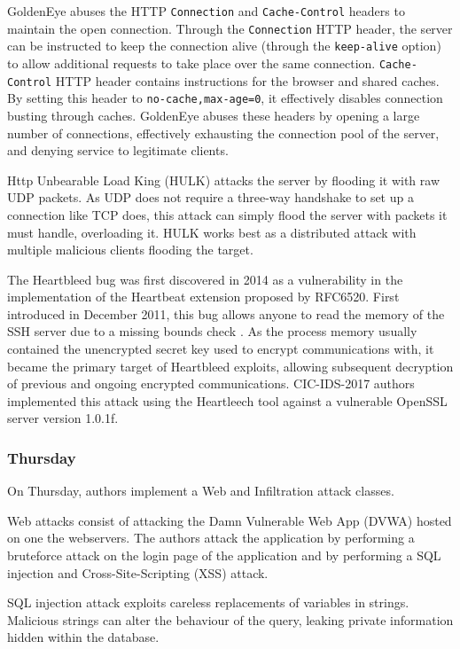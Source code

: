 GoldenEye abuses the HTTP \texttt{Connection} and \texttt{Cache-Control} headers to maintain the open connection. Through the \texttt{Connection} HTTP header, the server can be instructed to keep the connection alive (through the \texttt{keep-alive} option) to allow additional requests to take place over the same connection. \texttt{Cache-Control} HTTP header contains instructions for the browser and shared caches. By setting this header to \texttt{no-cache,max-age=0}, it effectively disables connection busting through caches.
GoldenEye abuses these headers by opening a large number of connections, effectively exhausting the connection pool of the server, and denying service to legitimate clients.

Http Unbearable Load King (HULK) attacks the server by flooding it with raw UDP packets. As UDP does not require a three-way handshake to set up a connection like TCP does, this attack can simply flood the server with packets it must handle, overloading it. HULK works best as a distributed attack with multiple malicious clients flooding the target.

The Heartbleed bug \cite{heartbleed} was first discovered in 2014 as a vulnerability in the implementation of the Heartbeat extension proposed by RFC6520. First introduced in December 2011, this bug allows anyone to read the memory of the SSH server due to a missing bounds check \cite{heartbleed_notice}. As the process memory usually contained the unencrypted secret key used to encrypt communications with, it became the primary target of Heartbleed exploits, allowing subsequent decryption of previous and ongoing encrypted communications. CIC-IDS-2017 authors implemented this attack using the Heartleech tool \cite{heartleech} against a vulnerable OpenSSL server version 1.0.1f. 

\subsubsection{Thursday}
On Thursday, authors implement a Web and Infiltration attack classes.

Web attacks consist of attacking the Damn Vulnerable Web App (DVWA) hosted on one the webservers. The authors attack the application by performing a bruteforce attack on the login page of the application and by performing a SQL injection and Cross-Site-Scripting (XSS) attack.

SQL injection attack exploits careless replacements of variables in strings. Malicious strings can alter the behaviour of the query, leaking private information hidden within the database. 

